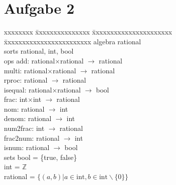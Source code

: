 \documentclass[12pt, twoside]{article}
\begin{document}
\section{Aufgabe 2}
\begin{tabbing}
xxxxxxxx \= xxxxxxxxxxxxxxx \= xxxxxxxxxxxxxxxxxxxxxx \=   xxxxxxxxxxxxxxxxxxxxxxxx  \kill
algebra \> rational          \\
sorts       \> rational, int, bool                                                  \\
ops         \> add:                 \> rational$\times$rational   \> $\rightarrow$ rational     \\
            \> multi:               \> rational$\times$rational   \> $\rightarrow$ rational     \\
            \> rproc:               \> rational                   \> $\rightarrow$ rational     \\
            \> isequal:             \> rational$\times$rational   \> $\rightarrow$ bool         \\
            \> frac:                \> int$\times$int             \> $\rightarrow$ rational     \\
            \> nom:                 \> rational                   \> $\rightarrow$ int          \\
            \> denom:               \> rational                   \> $\rightarrow$ int          \\
            \> num2frac:            \> int                        \> $\rightarrow$ rational     \\
            \> frac2num:            \> rational                   \> $\rightarrow$ int          \\
            \> isnum:               \> rational                   \> $\rightarrow$ bool         \\
sets        \> bool = \{true, false\} \\
            \> int = $\mathbb{Z}$ \\
            \> rational = $\{(a,b)|a \in \text{int}, b \in \text{int} \backslash \{0\}\}$       \\
     

\end{tabbing}
\end{document}
